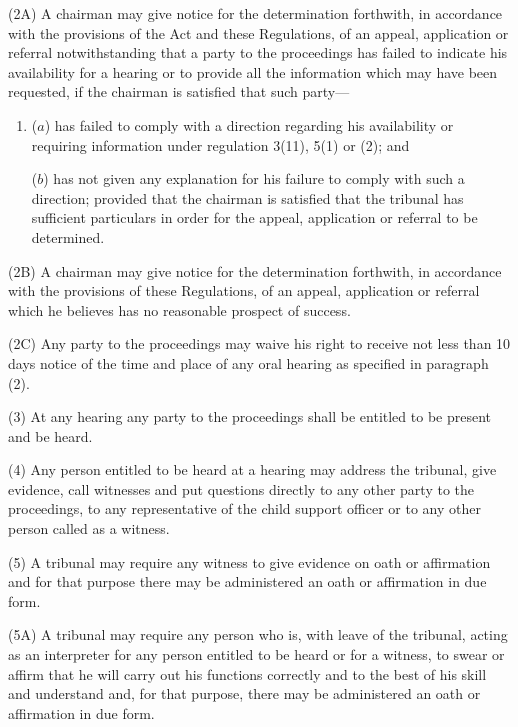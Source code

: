 \documentclass[12pt,a4paper]{article}
\begin{document}
(2A) A chairman may give notice for the determination forthwith, in accordance with the provisions of the Act and these Regulations, of an 
appeal, application or referral  %
notwithstanding that a party to the proceedings has failed to indicate his availability for a hearing or to provide all the information which may have been requested, if the chairman is satisfied that such party—
\begin{enumerate}\item[]
($a$) has failed to comply with a direction regarding his availability or requiring information under regulation 3(11), 5(1) or (2); and

($b$) has not given any explanation for his failure to comply with such a direction; provided that the chairman is satisfied that the tribunal has sufficient particulars in order for the 
appeal, application or referral  %
to be determined.
\end{enumerate}

(2B) A chairman may give notice for the determination forthwith, in accordance with the provisions of these Regulations, of an 
appeal, application or referral  %
which he believes has no reasonable prospect of success.

(2C) Any party to the proceedings may waive his right to receive not less than 10 days notice of the time and place of any oral hearing as specified in paragraph (2).

(3) At any hearing any party to the proceedings shall be entitled to be present and be heard.

(4) Any person entitled to be heard at a hearing may address the tribunal, give evidence, call witnesses and put questions directly to any other party to the proceedings, to any representative of the child support officer or to any other person called as a witness.

(5) A tribunal may require any witness to give evidence on oath or affirmation and for that purpose there may be administered an oath or affirmation in due form.

(5A) A tribunal may require any person who is, with leave of the tribunal, acting as an interpreter for any person entitled to be heard or for a witness, to swear or affirm that he will carry out his functions correctly and to the best of his skill and understand and, for that purpose, there may be administered an oath or affirmation in due form.
\end{document}
